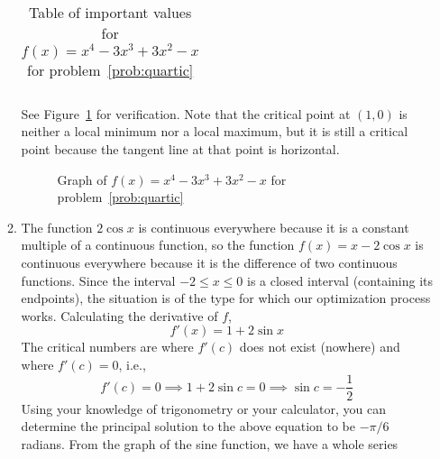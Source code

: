 \documentclass{article}
\begin{document}
\begin{enumerate}
\begin{enumerate}
\begin{table}[htbp]
\begin{tabular}{|l|l|l|}
      \end{tabular}
      \caption{Table of important values for $f(x)=x^4-3x^3+3x^2-x$ for problem~\ref{prob:quartic}}
      \label{tab:quartic}
    \end{table}  
    See Figure~\ref{fig:quartic} for verification.  Note that the critical
    point at $(1,0)$ is neither a local minimum nor a local maximum, but it
    is still a critical point because the tangent line at that point is
    horizontal.
    \begin{figure}[htbp]
      \centering
      \caption{Graph of $f(x)=x^4-3x^3+3x^2-x$ for problem~\ref{prob:quartic}}
      \label{fig:quartic}
    \end{figure}
  \item\label{prob:algetrig} %
    The function $2\cos x$ is continuous everywhere because it is a 
    constant multiple of a continuous function, so the function 
    $f(x)=x-2\cos x$ is continuous everywhere because it is the 
    difference of two continuous functions.  Since the interval 
    $-2\le x\le 0$ is a closed interval (containing its endpoints), the
    situation is of the type for which our optimization process works.
    Calculating the derivative of $f$,
    \begin{equation*}
      f'(x) = 1 + 2\sin x
    \end{equation*}
    The critical numbers are where $f'(c)$ does not exist (nowhere) and
    where $f'(c)=0$, i.e.,
    \begin{equation*}
      f'(c)=0 \implies 1+2\sin c = 0 \implies \sin c = -\frac{1}{2}
    \end{equation*}
    Using your knowledge of trigonometry or your calculator, you can
    determine the principal solution to the above equation to be $-\pi/6$
    radians.  From the graph of the sine function, we have a whole series

\end{enumerate}
\end{enumerate}
\end{document}
